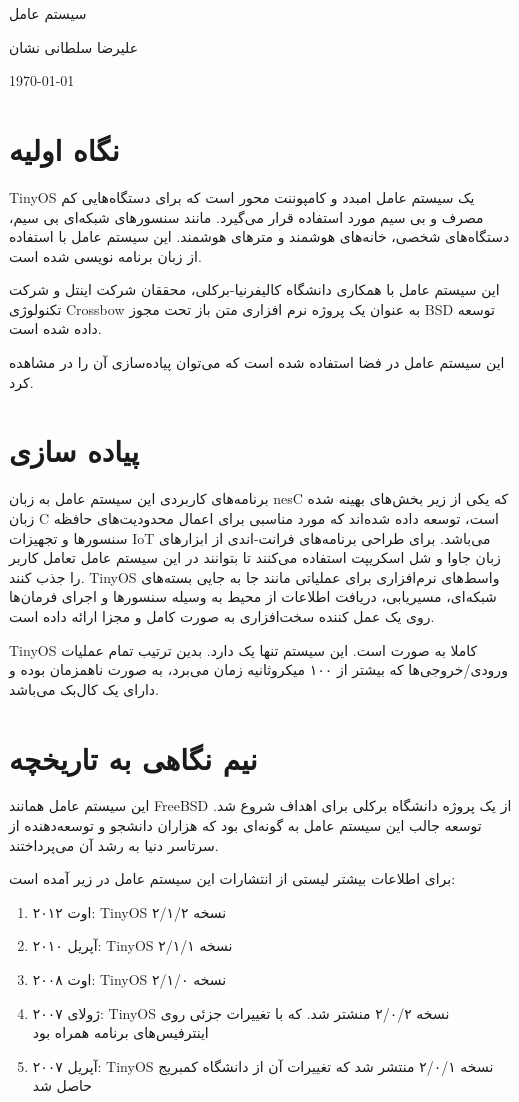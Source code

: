 \documentclass[20pt, a4paper]{article}
\begin{document}
\centerline{سیستم عامل }
\centerline{علیرضا سلطانی نشان}
\centerline{\today}
\tableofcontents

\section{نگاه اولیه}

TinyOS یک سیستم عامل امبدد و کامپوننت محور است که برای دستگاه‌هایی کم مصرف و بی
سیم مورد استفاده قرار می‌گیرد. مانند سنسور‌های شبکه‌ای بی سیم، دستگاه‌های شخصی،
خانه‌های هوشمند و متر‌های هوشمند. این سیستم عامل با استفاده از زبان 
برنامه نویسی شده است.

این سیستم عامل با همکاری دانشگاه کالیفرنیا-برکلی، محققان شرکت اینتل و شرکت
تکنولوژی Crossbow به عنوان یک پروژه نرم افزاری متن باز تحت مجوز BSD توسعه داده
شده است.

این سیستم عامل در فضا استفاده شده است که می‌توان پیاده‌سازی آن را در
 مشاهده کرد.

\section{پیاده سازی}

برنامه‌های کاربردی این سیستم عامل به زبان nesC که یکی از زیر بخش‌های بهینه شده
زبان C است، توسعه داده شده‌اند که مورد مناسبی برای اعمال محدودیت‌های حافظه
سنسور‌ها و تجهیزات IoT می‌باشد. برای طراحی برنامه‌های فرانت-اندی از ابزار‌های
زبان جاوا و شل اسکریپت استفاده می‌کنند تا بتوانند در این سیستم عامل تعامل کاربر
را جذب کنند. TinyOS واسط‌های نرم‌افزاری برای عملیاتی مانند جا به جایی بسته‌های
شبکه‌ای، مسیریابی، دریافت اطلاعات از محیط به وسیله سنسور‌ها و اجرای فرمان‌ها روی
یک عمل کننده سخت‌افزاری به صورت کامل و مجزا ارائه داده است.

TinyOS کاملا به صورت  است. این سیستم تنها یک  دارد. بدین ترتیب تمام عملیات ورودی/خروجی‌ها که بیشتر از ۱۰۰ میکروثانیه
زمان می‌برد، به صورت ناهمزمان بوده و دارای یک کال‌بک می‌باشد.

\section{نیم نگاهی به تاریخچه}

این سیستم عامل همانند FreeBSD از یک پروژه دانشگاه برکلی برای اهداف  شروع شد. توسعه جالب این سیستم عامل به گونه‌ای بود که هزاران دانشجو و
توسعه‌دهنده از سرتاسر دنیا به رشد آن می‌پرداختند.

برای اطلاعات بیشتر لیستی از انتشارات این سیستم عامل در زیر آمده است:

\begin{enumerate}
    \item اوت ۲۰۱۲: TinyOS نسخه ۲/۱/۲
    \item آپریل ۲۰۱۰: TinyOS نسخه ۲/۱/۱
    \item اوت ۲۰۰۸: TinyOS نسخه ۲/۱/۰
    \item ژولای ۲۰۰۷: TinyOS نسخه ۲/۰/۲ منشتر شد. که با تغییرات جزئی روی
    اینترفیس‌های برنامه همراه بود
    \item آپریل ۲۰۰۷: TinyOS نسخه ۲/۰/۱  منتشر شد که تغییرات آن از دانشگاه
    کمبریج حاصل شد
\end{enumerate}
\end{document}
